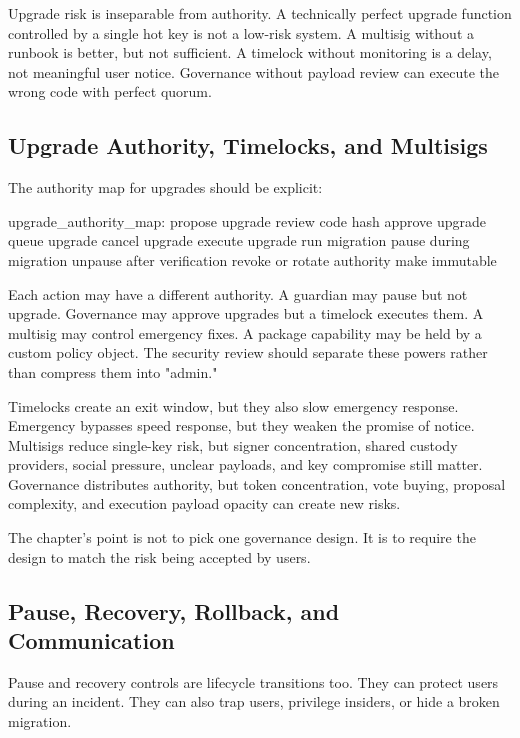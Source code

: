 Upgrade risk is inseparable from authority. A technically perfect upgrade function controlled by a single hot key is not a low-risk system. A multisig without a runbook is better, but not sufficient. A timelock without monitoring is a delay, not meaningful user notice. Governance without payload review can execute the wrong code with perfect quorum.

\subsection{Upgrade Authority, Timelocks, and Multisigs}

The authority map for upgrades should be explicit:

\begin{codeblock}
upgrade_authority_map:
    propose upgrade
    review code hash
    approve upgrade
    queue upgrade
    cancel upgrade
    execute upgrade
    run migration
    pause during migration
    unpause after verification
    revoke or rotate authority
    make immutable
\end{codeblock}

Each action may have a different authority. A guardian may pause but not upgrade. Governance may approve upgrades but a timelock executes them. A multisig may control emergency fixes. A package capability may be held by a custom policy object. The security review should separate these powers rather than compress them into "admin."

Timelocks create an exit window, but they also slow emergency response. Emergency bypasses speed response, but they weaken the promise of notice. Multisigs reduce single-key risk, but signer concentration, shared custody providers, social pressure, unclear payloads, and key compromise still matter. Governance distributes authority, but token concentration, vote buying, proposal complexity, and execution payload opacity can create new risks.

The chapter's point is not to pick one governance design. It is to require the design to match the risk being accepted by users.

\subsection{Pause, Recovery, Rollback, and Communication}

Pause and recovery controls are lifecycle transitions too. They can protect users during an incident. They can also trap users, privilege insiders, or hide a broken migration.

